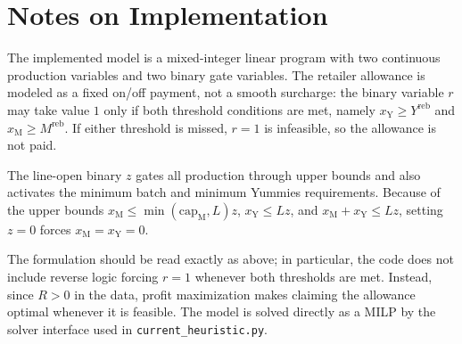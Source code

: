 \section*{Notes on Implementation}

The implemented model is a mixed-integer linear program with two continuous production variables and two binary gate variables. The retailer allowance is modeled as a fixed on/off payment, not a smooth surcharge: the binary variable \(r\) may take value \(1\) only if both threshold conditions are met, namely \(x_{\mathrm{Y}} \ge Y^{\text{reb}}\) and \(x_{\mathrm{M}} \ge M^{\text{reb}}\). If either threshold is missed, \(r=1\) is infeasible, so the allowance is not paid.

The line-open binary \(z\) gates all production through upper bounds and also activates the minimum batch and minimum Yummies requirements. Because of the upper bounds \(x_{\mathrm{M}} \le \min(\text{cap}_{\mathrm{M}},L)z\), \(x_{\mathrm{Y}} \le Lz\), and \(x_{\mathrm{M}}+x_{\mathrm{Y}} \le Lz\), setting \(z=0\) forces \(x_{\mathrm{M}}=x_{\mathrm{Y}}=0\).

The formulation should be read exactly as above; in particular, the code does not include reverse logic forcing \(r=1\) whenever both thresholds are met. Instead, since \(R>0\) in the data, profit maximization makes claiming the allowance optimal whenever it is feasible. The model is solved directly as a MILP by the solver interface used in \texttt{current\_heuristic.py}.
